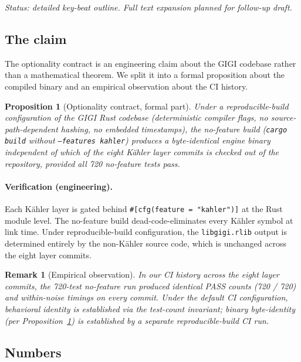 \documentclass[11pt,letterpaper]{article}
\newtheorem{proposition}[theorem]{Proposition}
\newtheorem{remark}[theorem]{Remark}
\begin{document}
\noindent\emph{Status: detailed key-beat outline. Full text expansion
planned for follow-up draft.}

\subsection{The claim}

The optionality contract is an engineering claim about the GIGI
codebase rather than a mathematical theorem. We split it into a
formal proposition about the compiled binary and an empirical
observation about the CI history.

\begin{proposition}[Optionality contract, formal part]
\label{prop:optionality}
Under a reproducible-build configuration of the GIGI Rust codebase
(deterministic compiler flags, no source-path-dependent hashing, no
embedded timestamps), the no-feature build (\texttt{cargo build}
without \texttt{--features kahler}) produces a byte-identical engine
binary independent of which of the eight K\"ahler layer commits is
checked out of the repository, provided all 720 no-feature tests
pass.
\end{proposition}

\paragraph{Verification (engineering).}
Each K\"ahler layer is gated behind
\verb|#[cfg(feature = "kahler")]| at the Rust module level. The
no-feature build dead-code-eliminates every K\"ahler symbol at link
time. Under reproducible-build configuration, the
\texttt{libgigi.rlib} output is determined entirely by the
non-K\"ahler source code, which is unchanged across the eight layer
commits.

\begin{remark}[Empirical observation]
\label{rem:optionality-empirical}
In our CI history across the eight layer commits, the 720-test
no-feature run produced identical PASS counts (720 / 720) and
within-noise timings on every commit. Under the default CI
configuration, behavioral identity is established via the
test-count invariant; binary byte-identity (per
Proposition~\ref{prop:optionality}) is established by a separate
reproducible-build CI run.
\end{remark}

\subsection{Numbers}
\end{document}
